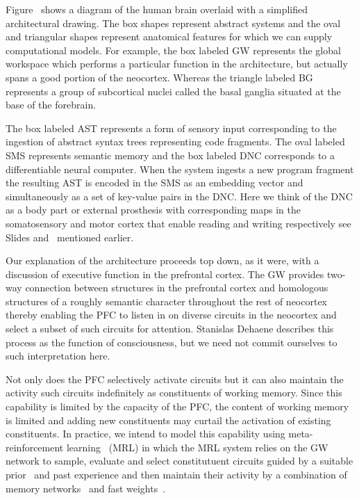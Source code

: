 
Figure~{} shows a diagram of the human brain overlaid with a simplified architectural drawing. The box shapes represent abstract systems and the oval and triangular shapes represent anatomical features for which we can supply computational models. For example, the box labeled GW represents the global workspace which performs a particular function in the architecture, but actually spans a good portion of the neocortex. Whereas the triangle labeled BG represents a group of subcortical nuclei called the basal ganglia situated at the base of the forebrain.

The box labeled AST represents a form of sensory input corresponding to the ingestion of abstract syntax trees representing code fragments. The oval labeled SMS represents semantic memory and the box labeled DNC corresponds to a differentiable neural computer. When the system ingests a new program fragment the resulting AST is encoded in the SMS as an embedding vector and simultaneously as a set of key-value pairs in the DNC. Here we think of the DNC as a body part or external prosthesis with corresponding maps in the somatosensory and motor cortex that enable reading and writing respectively \emdash{} see Slides {{}} and~{{}} mentioned earlier.

Our explanation of the architecture proceeds top down, as it were, with a discussion of executive function in the prefrontal cortex. The GW provides two-way connection between structures in the prefrontal cortex and homologous structures of a roughly semantic character throughout the rest of neocortex thereby enabling the PFC to listen in on diverse circuits in the neocortex and select a subset of such circuits for attention. Stanislas Dehaene describes this process as the function of consciousness, but we need not commit ourselves to such interpretation here.

Not only does the PFC selectively activate circuits but it can also maintain the activity such circuits indefinitely as constituents of working memory. Since this capability is limited by the capacity of the PFC, the content of working memory is limited and adding new constituents may curtail the activation of existing constituents. In practice, we intend to model this capability using meta-reinforcement learning~\cite{WangetalNATURE-NEUROSCIENCE-18} (MRL) in which the MRL system relies on the GW network to sample, evaluate and select constitutuent circuits guided by a suitable prior~\cite{BengioCoRR-17} and past experience and then maintain their activity by a combination of memory networks~\cite{WestonetalCoRR-14} and fast weights~\cite{BaetalCoRR-16}. 

